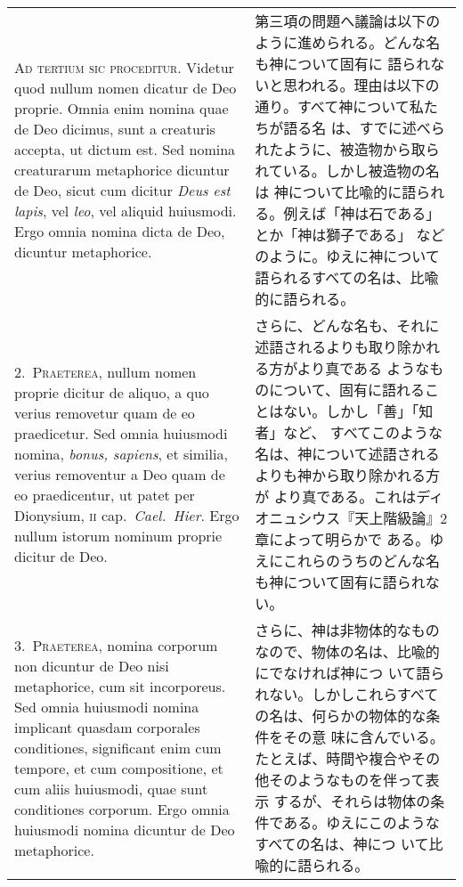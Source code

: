 \documentclass[paper=a4paper,fontsize=10pt,jafontsize=9pt,titlepage]{jlreq}
\begin{document}
\begin{longtable}{p{21em}p{21em}}

{\scshape Ad tertium sic proceditur}. Videtur quod nullum nomen dicatur de
Deo proprie. Omnia enim nomina quae de Deo dicimus, sunt a creaturis
accepta, ut dictum est. Sed nomina creaturarum metaphorice dicuntur de
Deo, sicut cum dicitur {\itshape Deus est lapis}, vel {\itshape leo}, vel
aliquid huiusmodi. Ergo omnia nomina dicta de Deo, dicuntur
metaphorice.

&

第三項の問題へ議論は以下のように進められる。どんな名も神について固有に
語られないと思われる。理由は以下の通り。すべて神について私たちが語る名
は、すでに述べられたように、被造物から取られている。しかし被造物の名は
神について比喩的に語られる。例えば「神は石である」とか「神は獅子である」
などのように。ゆえに神について語られるすべての名は、比喩的に語られる。

\\

2.~{\scshape Praeterea}, nullum nomen proprie dicitur de aliquo, a quo
verius removetur quam de eo praedicetur. Sed omnia huiusmodi nomina,
{\itshape bonus, sapiens}, et similia, verius removentur a Deo quam de eo
praedicentur, ut patet per Dionysium, {\scshape ii} cap.\ {\itshape Cael.\
Hier}. Ergo nullum istorum nominum proprie dicitur de Deo.

&

さらに、どんな名も、それに述語されるよりも取り除かれる方がより真である
ようなものについて、固有に語れることはない。しかし「善」「知者」など、
すべてこのような名は、神について述語されるよりも神から取り除かれる方が
より真である。これはディオニュシウス『天上階級論』2章によって明らかで
ある。ゆえにこれらのうちのどんな名も神について固有に語られない。

\\

3.~{\scshape Praeterea}, nomina corporum non dicuntur de Deo nisi
metaphorice, cum sit incorporeus. Sed omnia huiusmodi nomina implicant
quasdam corporales conditiones, significant enim cum tempore, et cum
compositione, et cum aliis huiusmodi, quae sunt conditiones
corporum. Ergo omnia huiusmodi nomina dicuntur de Deo metaphorice.

&

さらに、神は非物体的なものなので、物体の名は、比喩的にでなければ神につ
いて語られない。しかしこれらすべての名は、何らかの物体的な条件をその意
味に含んでいる。たとえば、時間や複合やその他そのようなものを伴って表示
するが、それらは物体の条件である。ゆえにこのようなすべての名は、神につ
いて比喩的に語られる。


\end{longtable}
\end{document}
